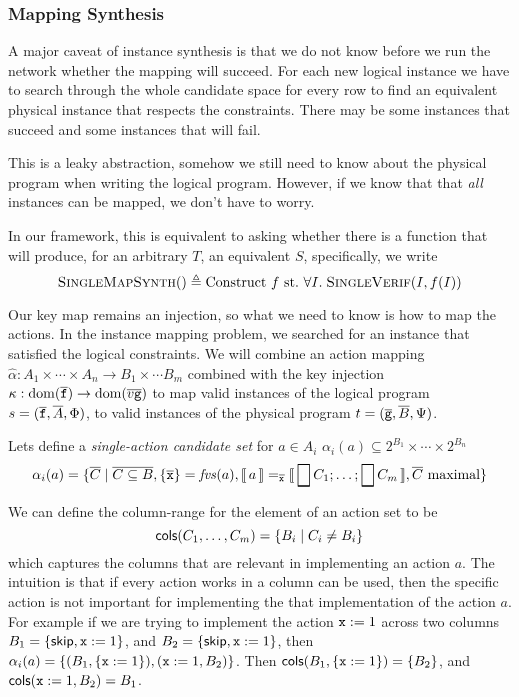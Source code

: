 \subsubsection{Mapping Synthesis}

A major caveat of instance synthesis is that we do not know before we
run the network whether the mapping will succeed. For each new logical
instance we have to search through the whole candidate space for every
row to find an equivalent physical instance that respects the
constraints. There may be some instances that succeed and some
instances that will fail.

This is a leaky abstraction, somehow we still need to know about the
physical program when writing the logical program. However, if we know
that that \emph{all} instances can be mapped, we don't have to worry.

In our framework, this is equivalent to asking whether there is a
function that will produce, for an arbitrary $T$, an equivalent $S$,
specifically, we write
\[\textsc{SingleMapSynth}() \triangleq \textrm{Construct}~f~\textrm{st.}~\forall I.\;
  \textsc{SingleVerif}(I, f(I))\]

Our key map remains an injection, so what we need to know is how to
map the actions. In the instance mapping problem, we searched for an
instance that satisfied the logical constraints. We will combine an
action mapping
$\hat\alpha : A_1 \times \cdots \times A_n \to B_1 \times \cdots B_m$
combined with the key injection
$\kappa : \mathrm{dom}(\overline{\texttt{f}}) \to \mathrm{dom}(\overline{v\texttt{g}})$ to map valid
instances of the logical program $s = (\overline{\texttt{f}}, \overline{A}, \Phi)$,
to valid instances of the physical program
$t = (\overline{\texttt{g}}, \overline{B}, \Psi)$.


Lets define a \emph{single-action candidate set} for $a \in A_i$
$\alpha_i(a) \subseteq 2^{B_1} \times \cdots \times 2^{B_n}$
\[\alpha_i(a) = \{ \vec C \mid
  \overline{C \subseteq B}, \{\overline{\var x}\}= \fvs(a), \bracbb{a}
  =_{\overline{\var x}} \bracbb{\Demon C_1; \ldots; \Demon C_m}, \vec
  C~\textrm{maximal} \}\]

We can define the column-range for the element of an action set to be
\[\mathsf{cols}(C_1,\ldots, C_m) = \{B_i \mid C_i \neq B_i\}\]
which captures the columns that are relevant in implementing an action
$a$. The intuition is that if every action works in a column can be
used, then the specific action is not important for implementing the
that implementation of the action $a$. For example if we are trying to
implement the action $\texttt{x} := 1$ across two columns
$B_1 = \{\mathsf{skip}, \texttt{x}:=1\}$, and $B_2 = \{\mathsf{skip}, \texttt{x}:=1\}$, then
$\alpha_i(a) = \{ (B_1,\{\texttt{x}:=1\}), (\texttt{x}:=1, B_2)\}$. Then
$\mathsf{cols}(B_1,\{\texttt{x}:=1\}) = \{B_2\}$, and
$\mathsf{cols}(\texttt{x}:=1, B_2) = B_1$.

